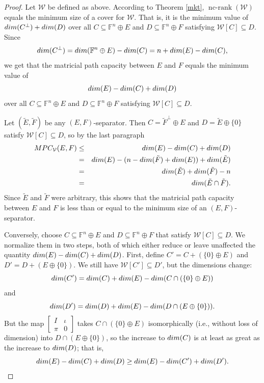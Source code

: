 \documentclass[10pt,a4paper]{amsart}
\newcommand\ncrank{\operatorname{nc-rank}}
\begin{document}
\begin{proof}
Let $\mathcal{W}$ be defined as above. According to Theorem \ref{mkt}, $\ncrank(\mathcal{W})$ equals the minimum size of a cover for $\mathcal{W}$. That is, it is the minimum value of ${\rm dim}(C^\perp) + {\rm dim}(D)$ over all $C \subseteq \mathbb{F}^n \oplus E$ and $D \subseteq \mathbb{F}^n \oplus F$ satisfying $\mathcal{W}[C] \subseteq D$. Since $${\rm dim}(C^\perp) = {\rm dim}(\mathbb{F}^n \oplus E) - {\rm dim}(C) = n + {\rm dim}(E) - {\rm dim}(C),$$ we get that the matricial path capacity between $E$ and $F$ equals the minimum value of $${\rm dim}(E) - {\rm dim}(C) + {\rm dim}(D)$$ over all $C \subseteq \mathbb{F}^n \oplus E$ and $D \subseteq \mathbb{F}^n \oplus F$ satisfying $\mathcal{W}[C] \subseteq D$.

Let $(\tilde{E}, \tilde{F})$ be any $(E,F)$-separator. Then $C = \tilde{F}^\perp \oplus E$ and $D = \tilde{E} \oplus \{0\}$ satisfy $\mathcal{W}[C] \subseteq D$, so by the last paragraph
\begin{eqnarray*}
MPC_{\mathcal{V}}(E,F) &\leq& {\rm dim}(E) - {\rm dim}(C) + {\rm dim}(D)\\
&=&{\rm dim}(E) - (n - {\rm dim}(\tilde{F}) + {\rm dim}(E)) + {\rm dim}(\tilde{E})\\
&=& {\rm dim}(\tilde{E}) + {\rm dim}(\tilde{F}) - n\\
&=& {\rm dim}(\tilde{E} \cap \tilde{F}).
\end{eqnarray*}
Since $\tilde{E}$ and $\tilde{F}$ were arbitrary, this shows that the matricial path capacity between $E$ and $F$ is less than or equal to the minimum size of an $(E,F)$-separator.

Conversely, choose $C \subseteq \mathbb{F}^n \oplus E$ and $D \subseteq \mathbb{F}^n \oplus F$ that satisfy $\mathcal{W}[C] \subseteq D$. We normalize them in two steps, both of which either reduce or leave unaffected the quantity ${\rm dim}(E) - {\rm dim}(C) + {\rm dim}(D)$. First, define $C' = C + (\{0\} \oplus E)$ and $D' = D + (E \oplus \{0\})$. We still have $\mathcal{W}[C'] \subseteq D'$, but the dimensions change: $${\rm dim}(C') = {\rm dim}(C) + {\rm dim}(E) - {\rm dim}(C \cap (\{0\} \oplus E))$$ and $${\rm dim}(D') = {\rm dim}(D) + {\rm dim}(E) - {\rm dim}(D \cap (E \oplus \{0\})).$$ But the map $\left[\begin{matrix}I&\iota\\ \pi&0\end{matrix}\right]$ takes $C \cap (\{0\} \oplus E)$ isomorphically (i.e., without loss of dimension) into $D \cap (E \oplus \{0\})$, so the increase to ${\rm dim}(C)$ is at least as great as the increase to ${\rm dim}(D)$; that is, $${\rm dim}(E) - {\rm dim}(C) + {\rm dim}(D) \geq {\rm dim}(E) - {\rm dim}(C') + {\rm dim}(D').$$ 


\end{proof}
\end{document}
